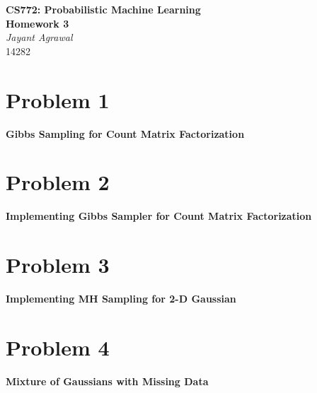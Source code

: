 \documentclass{article}
\begin{document}

\begin{center}
\textbf{\huge CS772: Probabilistic Machine Learning} \\
\textbf{\huge Homework 3} \\
\vspace{5pt}
\textit{\Large Jayant Agrawal} \\
14282
\end{center}

\section*{Problem 1}
\textbf{Gibbs Sampling for Count Matrix Factorization}
\section*{Problem 2}
\textbf{Implementing Gibbs Sampler for Count Matrix Factorization}
\section*{Problem 3}
\textbf{Implementing MH Sampling for 2-D Gaussian}
\section*{Problem 4}
\textbf{Mixture of Gaussians with Missing Data}
\end{document}
